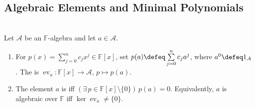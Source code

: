 \subsection{Algebraic Elements and Minimal Polynomials}

\begin{definition} \label{def:algebra-evaluation-and-algebraic-element} \\
Let $\mathcal{A}$ be an $\mathbb{F}$-algebra and let $a\in\mathcal{A}$.
\begin{enumerate}[label=(\roman*)]
\setlength{\itemsep}{0pt}
\item For $p(x)=\sum\limits_{j=0}^{n}c_jx^j\in\mathbb{F}[x]$, set $p(a)\defeq\sum\limits_{j=0}^{n}c_ja^j$, where $a^0\defeq1_{\mathcal{A}}$. The  is $\operatorname{ev}_a:\mathbb{F}[x]\to\mathcal{A}$, $p\mapsto p(a)$.
\item The element $a$ is  iff $(\exists\,p\in\mathbb{F}[x]\setminus\{0\})\,p(a)=0$. Equivalently, $a$ is algebraic over $\mathbb{F}$ iff $\ker\operatorname{ev}_a\neq\{0\}$.
\end{enumerate}
\end{definition}

